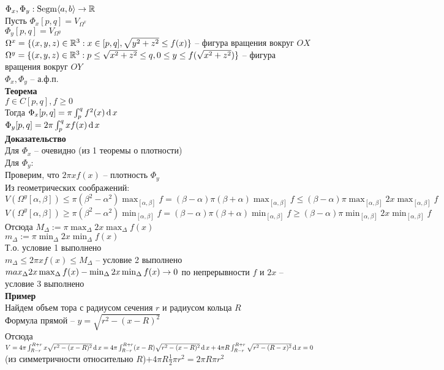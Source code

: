 \documentclass[12pt]{article}
\begin{document}
$\Phi_x, \Phi_y: \operatorname{Segm}\langle a, b \rangle \rightarrow \mathbb{R}$\\
Пусть $\Phi_x[p,q] = V_{\Omega^x}$\\
$\Phi_y[p,q] = V_{\Omega^y}$\\
$\Omega^x = \{(x,y,z) \in \mathbb{R}^3: x \in [p,q], \sqrt{y^2+z^2} \leq f(x)\}$ -- фигура вращения вокруг $OX$\\
$\Omega^y = \{(x,y,z) \in \mathbb{R}^3: p \leq \sqrt{x^2+z^2} \leq q, 0 \leq y \leq f(\sqrt{x^2+z^2}) \}$ -- фигура вращения вокруг $OY$\\
$\Phi_x, \Phi_y$ -- а.ф.п.\\
\textbf{Теорема}\\
$f\in C[p,q], f \geq 0$\\
Тогда $\Phi_x[p,q] = \pi\int_p^q f^2(x)\operatorname{d} x$\\
$\Phi_y[p,q] = 2\pi\int_p^q xf(x)\operatorname{d} x$\\
\textbf{Доказательство}\\
Для $\Phi_x$ -- очевидно (из 1 теоремы о плотности)\\
Для $\Phi_y$:\\
Проверим, что $2\pi xf(x)$ -- плотность $\Phi_y$\\
Из геометрических соображений:\\
$V(\Omega^y[\alpha, \beta]) \leq \pi(\beta^2 - \alpha^2)\max_{[\alpha, \beta]}f = (\beta-\alpha)\pi (\beta+\alpha)\max_{[\alpha, \beta]} f \leq (\beta - \alpha) \pi \max_{[\alpha, \beta]} 2x \max_{[\alpha, \beta]} f$\\
$V(\Omega^y[\alpha, \beta]) \geq \pi(\beta^2 - \alpha^2)\min_{[\alpha, \beta]}f = (\beta-\alpha)\pi (\beta+\alpha)\min_{[\alpha, \beta]} f \geq (\beta - \alpha) \pi \min_{[\alpha, \beta]} 2x \min_{[\alpha, \beta]} f$\\
Отсюда $M_\Delta := \pi \max_\Delta 2x \max_\Delta f(x)$\\
$m_\Delta := \pi \min_\Delta 2x \min_\Delta f(x)$\\
Т.о. условие 1 выполнено\\
$m_\Delta \leq 2\pi x f(x) \leq M_\Delta$ -- условие 2 выполнено\\
$max_\Delta 2x \max_\Delta f(x) - \min_\Delta 2x\min_\Delta f(x) \rightarrow 0$ по непрерывности $f$ и $2x$ -- условие 3 выполнено\\
\textbf{Пример}\\
Найдем объем тора с радиусом сечения $r$ и радиусом кольца $R$\\
Формула прямой -- $y = \sqrt{r^2 - (x-R)^2}$\\
Отсюда $V = 4\pi \int_{R-r}^{R+r} x\sqrt{r^2 - (x-R)^2} \operatorname{d} x = 4\pi \int_{R-r}^{R+r} (x-R)\sqrt{r^2-(x-R)^2}\operatorname{d} x + 4\pi R \int_{R-r}^{R+r} \sqrt{r^2-(R-x)^2}\operatorname{d} x = 0$(из симметричности относительно $R$)$ + 4\pi R\frac12 \pi r^2 = 2\pi R\pi r^2$\\
\end{document}
